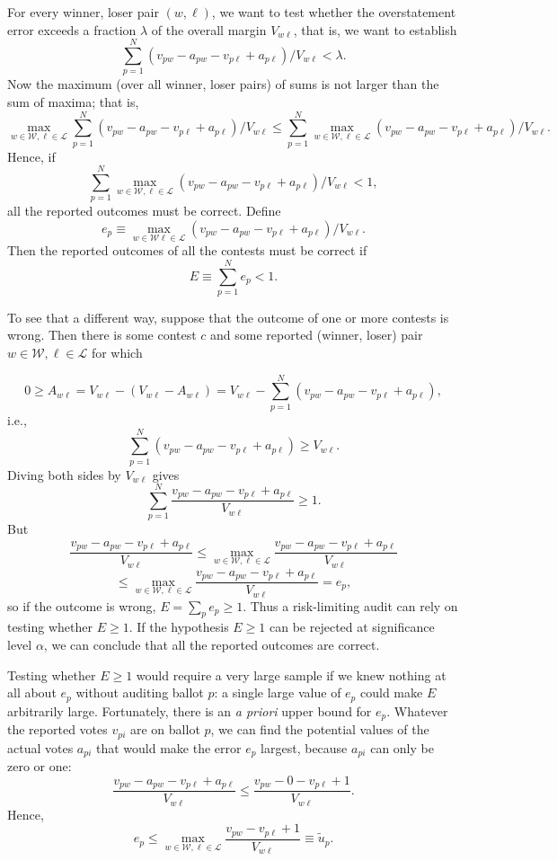 For every winner, loser pair $(w, \ell)$, we want to test
whether the overstatement error exceeds a fraction $\lambda$ of the overall margin 
$V_{w\ell}$,
that is, we want to establish
$$
   \sum_{p=1}^N (v_{pw}-a_{pw} - v_{p\ell} + a_{p\ell})/V_{w\ell} < \lambda.
$$
Now the maximum (over all winner, loser pairs) of sums
is not larger than the sum of maxima; that is,
$$
\max_{w \in \mathcal{W},  \ell \in \mathcal{L}}
   \sum_{p=1}^N (v_{pw}-a_{pw} - v_{p\ell} + a_{p\ell})/V_{w\ell}
   \le
  \sum_{p=1}^N  \max_{w \in \mathcal{W},  \ell \in \mathcal{L}} 
  (v_{pw}-a_{pw} - v_{p\ell} + a_{p\ell})/V_{w\ell}.
$$
Hence, if 
$$
\sum_{p=1}^N  \max_{w \in \mathcal{W},  \ell \in \mathcal{L}} 
  (v_{pw}-a_{pw} - v_{p\ell} + a_{p\ell})/V_{w\ell} < 1,
$$
all the reported outcomes must be correct.
Define 
$$
  e_p \equiv \max_{w \in \mathcal{W} \ell \in \mathcal{L}} (v_{pw}-a_{pw} - v_{p\ell} + a_{p\ell})/V_{w\ell}.
$$
Then the reported outcomes of all the contests must be correct if 
$$ 
  E \equiv \sum_{p=1}^N e_p < 1.
$$

To see that a different way, suppose that the outcome of one or more contests is wrong.
Then there is some contest $c$ and some reported (winner, loser) pair
$w \in \mathcal{W}, \ell \in \mathcal{L}$ for which

$$ 
   0 \ge A_{w\ell} = V_{w\ell} - (V_{w\ell} - A_{w\ell}) =
   V_{w\ell} - \sum_{p=1}^N (v_{pw} - a_{pw} - v_{p\ell} + a_{p\ell}),
$$
i.e.,
$$ 
\sum_{p=1}^N (v_{pw} - a_{pw} - v_{p\ell} + a_{p\ell}) \ge V_{w\ell}.
$$
Diving both sides by $V_{w\ell}$ gives
$$
\sum_{p=1}^N \frac{v_{pw} - a_{pw} - v_{p\ell} + a_{p\ell}}{V_{w\ell}} \ge 1.
$$
But
$$
\frac{v_{pw} - a_{pw} - v_{p\ell} + a_{p\ell}}{V_{w\ell}}
\le 
\max_{w \in \mathcal{W}, \ell \in \mathcal{L}} \frac{v_{pw}-a_{pw} - v_{p\ell} + a_{p\ell}}{V_{w\ell}}
$$
$$
\le 
\max_{w \in \mathcal{W}, \ell \in \mathcal{L}} \frac{v_{pw}-a_{pw} - v_{p\ell} + a_{p\ell}}{V_{w\ell}}
= e_p,
$$
so if the outcome is wrong, $E = \sum_p e_p \ge 1$.
Thus a risk-limiting audit can rely on testing whether $E \ge 1$.
If the hypothesis $E \ge 1$ can be rejected at significance level $\alpha$,
we can conclude that all the reported outcomes are correct.

Testing whether $E \ge 1$ would require a very large sample if we knew nothing at
all about $e_p$ without auditing ballot $p$: a single large value of $e_p$ could make
$E$ arbitrarily large.
Fortunately, there is an \emph{a priori} upper bound for $e_p$.
Whatever the reported votes $v_{pi}$ are on ballot $p$, we can find the
potential values of the actual votes $a_{pi}$ that would make the
error $e_p$ largest, because $a_{pi}$ can only be zero or one:
$$
    \frac{v_{pw}-a_{pw} - v_{p\ell} + a_{p\ell}}{V_{w\ell}} \le 
    \frac{v_{pw}- 0 - v_{p\ell} + 1}{V_{w\ell}}.
$$
Hence,
$$
    e_p \le \max_{w \in \mathcal{W}, \ell \in \mathcal{L}} 
    \frac{v_{pw} - v_{p\ell} + 1}{V_{w\ell}} \equiv \tilde{u}_p.
$$

